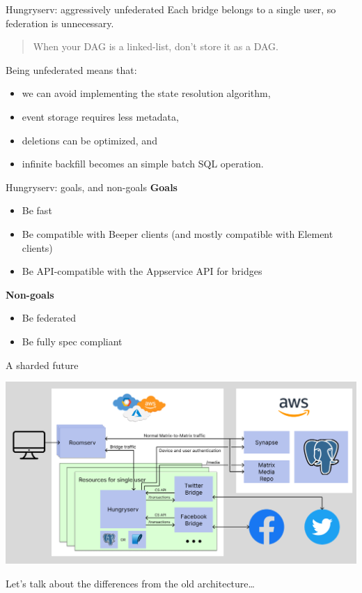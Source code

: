 \documentclass{beeper}
\begin{document}
\begin{frame}{Hungryserv: aggressively unfederated}
    Each bridge belongs to a single user, so federation is unnecessary. \\
    \pause

    \begin{quote}
        When your DAG is a linked-list, don't store it as a DAG.
    \end{quote}
    \pause

    Being unfederated means that:
    \begin{itemize}
        \item we can avoid implementing the state resolution algorithm,
        \item event storage requires less metadata,
        \item deletions can be optimized, and
        \item infinite backfill becomes an simple batch SQL operation.
    \end{itemize}
\end{frame}

\begin{frame}{Hungryserv: goals, and non-goals}
    \textbf{Goals}
    \begin{itemize}
        \item Be fast
        \item Be compatible with Beeper clients (and mostly compatible with
            Element clients)
        \item Be API-compatible with the Appservice API for bridges
    \end{itemize}
    \pause

    \textbf{Non-goals}
    \begin{itemize}
        \item Be federated
        \item Be fully spec compliant
    \end{itemize}
\end{frame}

\begin{frame}{A sharded future}
    \centerline{\includegraphics[width=1.15\textwidth]{images/new-architecture}}

    Let's talk about the differences from the old architecture\ldots
\end{frame}
\end{document}
